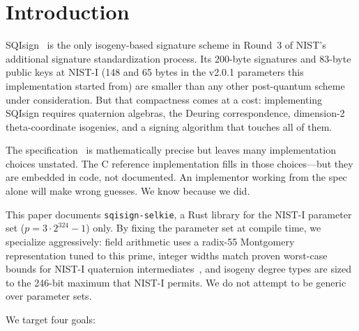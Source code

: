 \section{Introduction}
\label{sec:intro}

SQIsign~\cite{sqisign-spec-v3.0} is the only isogeny-based signature scheme
in Round~3 of NIST's additional signature standardization process.
Its 200-byte signatures and 83-byte public keys at NIST-I (148 and 65
bytes in the v2.0.1 parameters this implementation started from) are
smaller than any other post-quantum scheme under consideration.  But that
compactness comes at a cost: implementing SQIsign requires quaternion
algebras, the Deuring correspondence, dimension-2 theta-coordinate
isogenies, and a signing algorithm that touches all of them.

The specification~\cite{sqisign-spec-v2.0.1,sqisign-spec-v3.0} is mathematically precise but
leaves many implementation choices unstated.  The C reference
implementation fills in those choices---but they are embedded in code,
not documented.  An implementor working from the spec alone will make
wrong guesses.  We know because we did.

This paper documents \texttt{sqisign-selkie}, a Rust library for the
NIST-I parameter set ($p = 3 \cdot 2^{324} - 1$) only.  By fixing
the parameter set at compile time, we specialize aggressively: field
arithmetic uses a radix-55 Montgomery representation tuned to this
prime, integer widths match proven worst-case bounds for NIST-I
quaternion intermediates~\cite{EPRINT:KLKL25}, and isogeny degree types are
sized to the 246-bit maximum that NIST-I permits.  We do not attempt
to be generic over parameter sets.

We target four goals:


